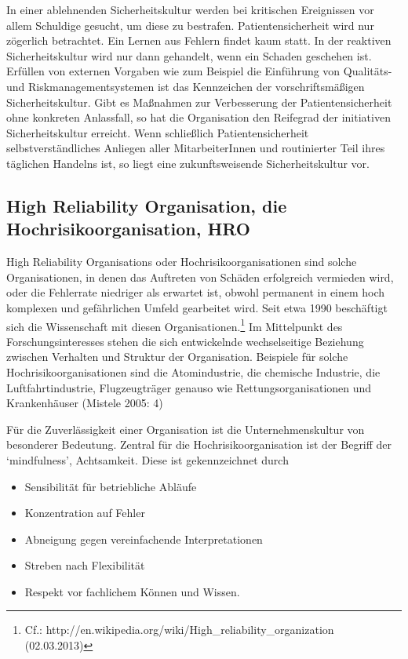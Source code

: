In einer ablehnenden Sicherheitskultur werden bei kritischen
Ereignissen vor allem Schuldige gesucht, um diese zu
bestrafen. Patientensicherheit wird nur zögerlich
betrachtet. Ein Lernen aus Fehlern findet kaum statt. In
der reaktiven Sicherheitskultur wird nur dann gehandelt,
wenn ein Schaden geschehen ist. Erfüllen von externen
Vorgaben wie zum Beispiel die Einführung von Qualitäts- und
Riskmanagementsystemen ist das Kennzeichen der
vorschriftsmäßigen Sicherheitskultur. Gibt es Maßnahmen zur
Verbesserung der Patientensicherheit ohne konkreten
Anlassfall, so hat die Organisation den Reifegrad der
initiativen Sicherheitskultur erreicht. Wenn schließlich
Patientensicherheit selbstverständliches Anliegen aller
MitarbeiterInnen und routinierter Teil ihres täglichen
Handelns ist, so liegt eine zukunftsweisende
Sicherheitskultur vor.




\subsection{High Reliability Organisation, die
Hochrisikoorganisation, HRO}

High Reliability Organisations oder Hochrisikoorganisationen
sind solche Organisationen, in denen das Auftreten von
Schäden erfolgreich vermieden wird, oder die Fehlerrate
niedriger als erwartet ist, obwohl permanent in einem hoch
komplexen und gefährlichen Umfeld gearbeitet wird. Seit
etwa 1990 beschäftigt sich die Wissenschaft mit diesen
Organisationen.\footnote{ Cf.:
http://en.wikipedia.org/wiki/High\_reliability\_organization
(02.03.2013)} Im Mittelpunkt des Forschungsinteresses
stehen die sich entwickelnde wechselseitige Beziehung
zwischen Verhalten und Struktur der Organisation. Beispiele
für solche Hochrisikoorganisationen sind die Atomindustrie,
die chemische Industrie, die Luftfahrtindustrie,
Flugzeugträger genauso wie Rettungsorganisationen und
Krankenhäuser (Mistele 2005: 4)




Für die Zuverlässigkeit einer Organisation ist die
Unternehmenskultur von besonderer Bedeutung. Zentral für
die Hochrisikoorganisation ist der Begriff der
\enquote*{mindfulness}, Achtsamkeit. Diese ist gekennzeichnet durch

\begin{itemize}
  \item Sensibilität für betriebliche Abläufe
  \item Konzentration auf Fehler
  \item Abneigung gegen vereinfachende Interpretationen
  \item Streben nach Flexibilität
  \item Respekt vor fachlichem Können und Wissen.
\end{itemize}




